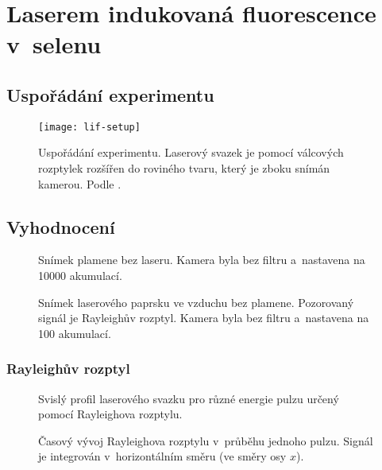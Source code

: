 \chapter[LIF]{Laserem indukovaná fluorescence v~selenu}

\providecommand\xpos{x}
\providecommand\ypos{y}
\providecommand\laser{L}
\providecommand\lif{F}

\section{Uspořádání experimentu}
\label{sec:lif-setup}

\begin{figure}
	\texttt{[image: lif-setup]}
	\caption{Uspořádání experimentu.
		Laserový svazek je pomocí válcových rozptylek rozšířen
		do roviného tvaru, který je zboku snímán kamerou.
		Podle \cite{lif-oh}.}
	\label{fig:lif-setup}
\end{figure}

\section{Vyhodnocení}
\label{sec:lif-method}

\begin{figure}
	
	\caption{Snímek plamene bez laseru.
		Kamera byla bez filtru a~nastavena na \num{10000} akumulací.}
	\label{fig:lif-results-flame}
\end{figure}

\begin{figure}
	
	\caption{Snímek laserového paprsku ve vzduchu bez plamene.
		Pozorovaný signál je Rayleighův rozptyl.
		Kamera byla bez filtru a~nastavena na \num{100} akumulací.}
	\label{fig:lif-rayleigh-example}
\end{figure}

\subsection{Rayleighův rozptyl}
\label{sec:lif-rayleigh}

\begin{figure}
	
	\caption{Svislý profil laserového svazku pro různé energie pulzu
		určený pomocí Rayleighova rozptylu.}
	\label{fig:lif-rayleigh-profile}
\end{figure}

\begin{figure}
	\centerline{}
	\caption{Časový vývoj Rayleighova rozptylu v~průběhu jednoho pulzu.
		Signál je integrován v~horizontálním směru (ve směry osy $x$).}
	\label{fig:lif-rayleigh-time}
\end{figure}
